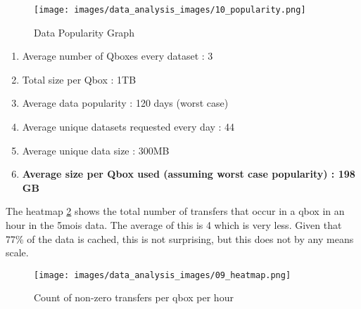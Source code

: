 \begin{figure}
    \centering
    \texttt{[image: images/data\_analysis\_images/10\_popularity.png]}
    \caption{Data Popularity Graph}
    \label{fig:popular}
\end{figure}


\begin{enumerate}
    \item Average number of Qboxes every dataset : 3
    \item Total size per Qbox : 1TB
    \item Average data popularity : 120 days (worst case)
    \item Average unique datasets requested every day : 44
    \item Average unique data size : 300MB
    \item \textbf{Average size per Qbox used (assuming worst case popularity) : 198 GB}
\end{enumerate}

The heatmap \ref{fig:heatmap} shows the total number of transfers that occur in a qbox in an hour in the 5mois data. The average of this is 4 which is very less. Given that 77\% of the data is cached, this is not surprising, but this does not by any means scale.

\begin{figure}
    \centering
    \texttt{[image: images/data\_analysis\_images/09\_heatmap.png]}
    \caption{Count of non-zero transfers per qbox per hour}
    \label{fig:heatmap}
\end{figure}